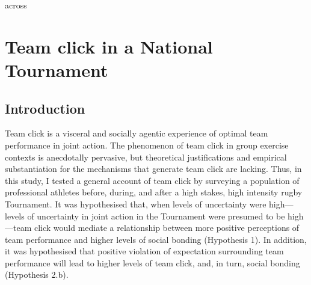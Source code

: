 across
\begin{savequote}[8cm]

  \qauthor{}
\end{savequote}


\chapter{\label{chap:tournamentSurvey}Team click in a National Tournament}
                                            \begin{CJK}{UTF8}{gbsn}

\minitoc

\section{Introduction\label{sect:introSurvey}}
Team click is a visceral and socially agentic experience of optimal team performance in joint action.
The phenomenon of team click in group exercise contexts is anecdotally pervasive, but theoretical justifications and empirical substantiation for the mechanisms that generate team click are lacking.  Thus, in this study, I tested a general account of team click by surveying a population of professional athletes before, during, and after a high stakes, high intensity rugby Tournament.   It was hypothesised that, when levels of uncertainty were high---levels of uncertainty in joint action in the Tournament were presumed to be high---team click would mediate a relationship between more positive perceptions of team performance and higher levels of social bonding (Hypothesis 1).  In addition, it was hypothesised that positive violation of expectation surrounding team performance will lead to higher levels of team click, and, in turn, social bonding (Hypothesis 2.b).


\end{CJK}
